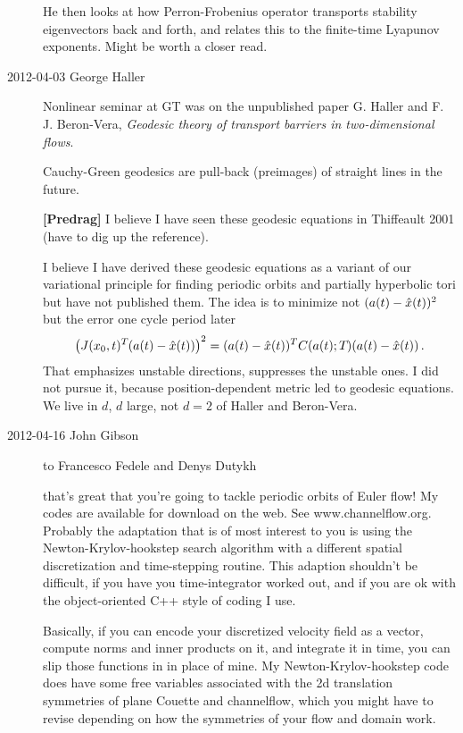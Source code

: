 \begin{description}
He then looks at how Perron-Frobenius operator transports
stability eigenvectors back and forth, and relates this to
the finite-time Lyapunov exponents. Might be worth a closer read.

\item[2012-04-03 George Haller]
Nonlinear seminar at GT was on the unpublished paper G. Haller and F. J.
Beron-Vera, \emph{Geodesic theory of transport barriers in
two-dimensional flows}.

Cauchy-Green geodesics are pull-back (preimages) of straight lines in the future.

{\bf [Predrag]}
I believe I have seen these geodesic equations in Thiffeault 2001 (have
to dig up  the reference).

I believe I have derived these geodesic equations as a variant of our
variational principle for finding periodic orbits and partially
hyperbolic tori but have not published
them. The idea is to minimize not $(a(t) -\hat{x}(t))^2$ but
the error one cycle period later
\[
\left(J({x_0},t)^{T_{}}(a(t) -\hat{x}(t))\right)^2
= (a(t) -\hat{x}(t))^T C(a(t); {T_{}})(a(t) -\hat{x}(t))
\,.
\]
That emphasizes unstable directions, suppresses the unstable ones. I did
not pursue it, because position-dependent metric led to geodesic
equations. We live in $d$\dmn, $d$ large, not $d=2$ of Haller and
Beron-Vera.

\item[2012-04-16 John Gibson] to Francesco Fedele and Denys Dutykh

that's great that you're going to tackle periodic orbits of Euler
flow! My codes are available for download on the web. See
www.channelflow.org. Probably the adaptation that is of most interest
to you is using the Newton-Krylov-hookstep search algorithm with a
different spatial discretization and time-stepping routine. This
adaption shouldn't be difficult, if you have you time-integrator
worked out, and if you are ok with the object-oriented C++ style of
coding I use.

Basically, if you can encode your discretized velocity field as a
vector, compute norms and inner products on it, and integrate it in
time, you can slip those functions in in place of mine. My
Newton-Krylov-hookstep code does have some free variables associated
with the 2d translation symmetries of plane Couette and channelflow,
which you might have to revise depending on how the symmetries of your
flow and domain work.


\end{description}

